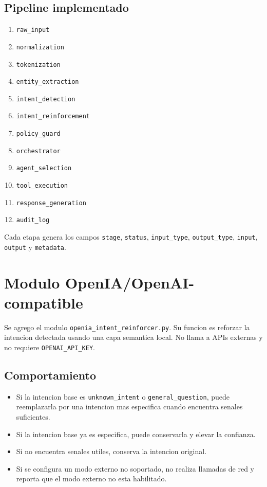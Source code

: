 \documentclass[12pt,letterpaper]{article}
\begin{document}
\subsection{Pipeline implementado}

\begin{enumerate}
  \item \texttt{raw\_input}
  \item \texttt{normalization}
  \item \texttt{tokenization}
  \item \texttt{entity\_extraction}
  \item \texttt{intent\_detection}
  \item \texttt{intent\_reinforcement}
  \item \texttt{policy\_guard}
  \item \texttt{orchestrator}
  \item \texttt{agent\_selection}
  \item \texttt{tool\_execution}
  \item \texttt{response\_generation}
  \item \texttt{audit\_log}
\end{enumerate}

Cada etapa genera los campos \texttt{stage}, \texttt{status}, \texttt{input\_type}, \texttt{output\_type}, \texttt{input}, \texttt{output} y \texttt{metadata}.

\section{Modulo OpenIA/OpenAI-compatible}

Se agrego el modulo \texttt{openia\_intent\_reinforcer.py}. Su funcion es reforzar la intencion detectada usando una capa semantica local. No llama a APIs externas y no requiere \texttt{OPENAI\_API\_KEY}.

\subsection{Comportamiento}

\begin{itemize}
  \item Si la intencion base es \texttt{unknown\_intent} o \texttt{general\_question}, puede reemplazarla por una intencion mas especifica cuando encuentra senales suficientes.
  \item Si la intencion base ya es especifica, puede conservarla y elevar la confianza.
  \item Si no encuentra senales utiles, conserva la intencion original.
  \item Si se configura un modo externo no soportado, no realiza llamadas de red y reporta que el modo externo no esta habilitado.
\end{itemize}
\end{document}
